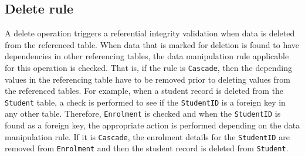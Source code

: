 \subsection{Delete rule} A delete operation triggers a referential integrity
		validation when data is deleted from the referenced table.  When data that is
		marked for deletion is found to have dependencies in other referencing tables,  
		the data manipulation rule applicable for this operation is checked. 
		That is, if the rule is \texttt{Cascade},   then the depending values
		in the referencing table have to be removed prior to deleting values from the
		referenced tables.  For example,   when a student record is deleted from the
		\texttt{Student} table,   a check is performed to see if the
		\texttt{StudentID} is a foreign key in any other table.  Therefore,  
		\texttt{Enrolment} is checked and when the \texttt{StudentID} is found
		as a foreign key,   the appropriate action is performed depending on the data
		manipulation rule.  If it is \texttt{Cascade},   the enrolment details for the
		\texttt{StudentID} are removed from \texttt{Enrolment} and then the student
		record is deleted from 	\texttt{Student}. 
	


 

